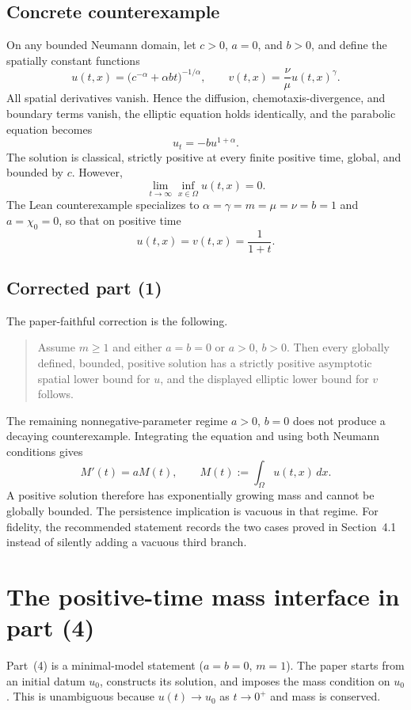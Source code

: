 \documentclass[11pt]{article}
\newcommand{\Om}{\Omega}
\begin{document}
\subsection{Concrete counterexample}

On any bounded Neumann domain, let $c>0$, $a=0$, and $b>0$, and define the
spatially constant functions
\[
  u(t,x)=\bigl(c^{-\alpha}+\alpha b t\bigr)^{-1/\alpha},
  \qquad
  v(t,x)=\frac{\nu}{\mu}u(t,x)^{\gamma}.
\]
All spatial derivatives vanish.  Hence the diffusion, chemotaxis-divergence,
and boundary terms vanish, the elliptic equation holds identically, and the
parabolic equation becomes
\[
  u_t=-b u^{1+\alpha}.
\]
The solution is classical, strictly positive at every finite positive time,
global, and bounded by $c$.  However,
\[
  \lim_{t\to\infty}\inf_{x\in\Om}u(t,x)=0.
\]
The Lean counterexample specializes to
$\alpha=\gamma=m=\mu=\nu=b=1$ and $a=\chi_0=0$, so that on positive time
\[
  u(t,x)=v(t,x)=\frac{1}{1+t}.
\]

\subsection{Corrected part (1)}

The paper-faithful correction is the following.

\begin{quote}
Assume $m\geq1$ and either $a=b=0$ or $a>0$, $b>0$.  Then every globally
defined, bounded, positive solution has a strictly positive asymptotic spatial
lower bound for $u$, and the displayed elliptic lower bound for $v$ follows.
\end{quote}

The remaining nonnegative-parameter regime $a>0$, $b=0$ does not produce a
decaying counterexample.  Integrating the equation and using both Neumann
conditions gives
\[
  M'(t)=aM(t), \qquad M(t):=\int_{\Om}u(t,x)\,dx.
\]
A positive solution therefore has exponentially growing mass and cannot be
globally bounded.  The persistence implication is vacuous in that regime.
For fidelity, the recommended statement records the two cases proved in
Section~4.1 instead of silently adding a vacuous third branch.

\section{The positive-time mass interface in part (4)}

Part~(4) is a minimal-model statement ($a=b=0$, $m=1$).  The paper starts from
an initial datum $u_0$, constructs its solution, and imposes the mass condition
on $u_0$.  This is unambiguous because $u(t)\to u_0$ as $t\to0^+$ and mass is
conserved.
\end{document}
